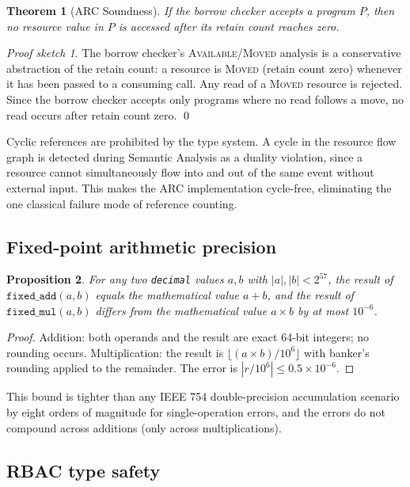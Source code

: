 \documentclass[11pt,a4paper]{article}
\newtheorem{theorem}{Theorem}[section]
\newtheorem{proposition}[theorem]{Proposition}
\theoremstyle{remark}
\newtheorem*{proofsketch}{Proof sketch}
\begin{document}
\begin{theorem}[ARC Soundness]\label{thm:arc}
If the borrow checker accepts a program $P$, then no resource value in
$P$ is accessed after its retain count reaches zero.
\end{theorem}

\begin{proofsketch}
The borrow checker's \textsc{Available}/\textsc{Moved} analysis is a
conservative abstraction of the retain count: a resource is
\textsc{Moved} (retain count zero) whenever it has been passed to a
consuming call. Any read of a \textsc{Moved} resource is rejected.
Since the borrow checker accepts only programs where no read follows a
move, no read occurs after retain count zero. \qed
\end{proofsketch}

Cyclic references are prohibited by the type system. A cycle in the
resource flow graph is detected during Semantic Analysis as a duality
violation, since a resource cannot simultaneously flow into and out of
the same event without external input. This makes the ARC
implementation cycle-free, eliminating the one classical failure mode
of reference counting.

\subsection{Fixed-point arithmetic precision}

\begin{proposition}\label{prop:fp}
For any two \texttt{decimal} values $a, b$ with $|a|, |b| < 2^{57}$, the
result of $\texttt{fixed\_add}(a,b)$ equals the mathematical value
$a+b$, and the result of $\texttt{fixed\_mul}(a,b)$ differs from the
mathematical value $a \times b$ by at most $10^{-6}$.
\end{proposition}

\begin{proof}
Addition: both operands and the result are exact 64-bit integers; no
rounding occurs. Multiplication: the result is
$\lfloor (a \times b)/10^{6}\rfloor$ with banker's rounding applied to
the remainder. The error is $|r/10^{6}| \le 0.5 \times 10^{-6}$.
\end{proof}

This bound is tighter than any IEEE 754 double-precision accumulation
scenario by eight orders of magnitude for single-operation errors, and
the errors do not compound across additions (only across
multiplications).

\subsection{RBAC type safety}
\end{document}
